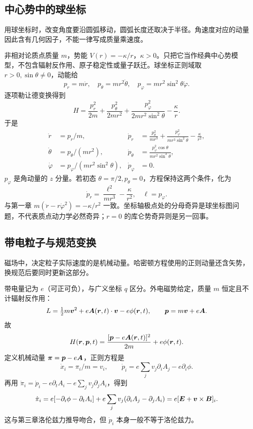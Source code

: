 \subsection{中心势中的球坐标}
用球坐标时，改变角度要沿圆弧移动，圆弧长度还取决于半径。角速度对应的动量因此含有几何因子，不能一律写成质量乘速度。

\begin{example}[中心势的哈密顿方程与径向核验]
非相对论质点质量 $m$，势能 $V(r)=-\kappa/r$，$\kappa>0$。只把它当作经典中心势模型，不包含辐射反作用、原子稳定性或量子跃迁。球坐标正则域取 $r>0,\sin\theta\ne0$，动能给
\[
p_r=m\dot r,\quad p_\theta=mr^2\dot\theta,\quad
p_\varphi=mr^2\sin^2\theta\dot\varphi.
\]
逐项勒让德变换得到
\[
H=\frac{p_r^2}{2m}+\frac{p_\theta^2}{2mr^2}
+\frac{p_\varphi^2}{2mr^2\sin^2\theta}-\frac\kappa r.
\]
于是
\begin{align*}
\dot r&=p_r/m,&\dot p_r&=\frac{p_\theta^2}{mr^3}+\frac{p_\varphi^2}{mr^3\sin^2\theta}-\frac\kappa{r^2},\\
\dot\theta&=p_\theta/(mr^2),&\dot p_\theta&=\frac{p_\varphi^2\cos\theta}{mr^2\sin^3\theta},\\
\dot\varphi&=p_\varphi/(mr^2\sin^2\theta),&\dot p_\varphi&=0.
\end{align*}
$p_\varphi$ 是角动量的 $z$ 分量。若初态 $\theta=\pi/2,p_\theta=0$，方程保持这两个条件，化为
\[
\dot p_r=\frac{\ell^2}{mr^3}-\frac\kappa{r^2},\quad \ell=p_\varphi.
\]
与第一章 $m(\ddot r-r\dot\varphi^2)=-\kappa/r^2$ 一致。坐标轴极点处的分母奇异是球坐标图问题，不代表质点动力学必然奇异；$r=0$ 的库仑势奇异则是另一回事。
\end{example}

\subsection{带电粒子与规范变换}
磁场中，决定粒子实际速度的是机械动量。哈密顿方程使用的正则动量还含矢势，换规范后要同时更新这部分。

带电量记为 $e$（可正可负），与广义坐标 $q$ 区分。外电磁势给定，质量 $m$ 恒定且不计辐射反作用：
\[
L=\tfrac12m\boldsymbol{v}^2+e\boldsymbol{A}(\boldsymbol{r},t)\cdot\boldsymbol{v}-e\phi(\boldsymbol{r},t),\qquad
\boldsymbol{p}=m\boldsymbol{v}+e\boldsymbol{A}.
\]
故
\begin{equation}
H(\boldsymbol{r},\boldsymbol{p},t)=\frac{[\boldsymbol{p}-e\boldsymbol{A}(\boldsymbol{r},t)]^2}{2m}+e\phi(\boldsymbol{r},t).
\label{eq:em-hamiltonian}
\end{equation}
定义机械动量 $\boldsymbol\pi=\boldsymbol{p}-e\boldsymbol{A}$，正则方程是
\[
\dot x_i=\pi_i/m=v_i,\qquad
\dot p_i=e\sum_jv_j\partial_i A_j-e\partial_i\phi.
\]
再用 $\dot\pi_i=\dot p_i-e\partial_tA_i-e\sum_jv_j\partial_jA_i$，得到
\[
\dot\pi_i=e[-\partial_i\phi-\partial_tA_i]
+e\sum_jv_j(\partial_iA_j-\partial_jA_i)
=e[\boldsymbol{E}+\boldsymbol{v}\times\boldsymbol{B}]_i.
\]
这与第三章洛伦兹力推导吻合，但 $\dot p_i$ 本身一般不等于洛伦兹力。

